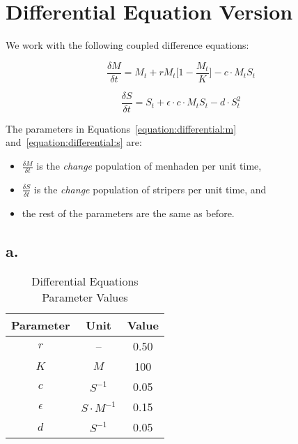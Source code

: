 \section{Differential Equation Version}
\label{sec:defferential-equation-version}

We work with the following coupled difference equations:

\begin{equation}
    \label{equation:differential:m}
    \frac{\delta M}{\delta t} = M_t + r M_t \bigg[ 1 - \frac{M_t}{K} \bigg] - c \cdot M_t S_t
\end{equation}

\begin{equation}
    \label{equation:differential:s}
    \frac{\delta S}{\delta t} = S_t + \epsilon \cdot c \cdot M_t S_t - d \cdot S_t^{2}
\end{equation}

The parameters in Equations~\ref{equation:differential:m} and~\ref{equation:differential:s} are:

\begin{itemize}
    \item $\frac{\delta M}{\delta t}$ is the \textit{change} population of menhaden per unit time,
    \item $\frac{\delta S}{\delta t}$ is the \textit{change} population of stripers per unit time, and
    \item the rest of the parameters are the same as before.
\end{itemize}


\subsection*{a.}

\begin{table}[h!]
    \begin{center}
        \begin{tabular}{c|c|c}
            \textbf{Parameter} & \textbf{Unit} & \textbf{Value} \\
            \hline
            $r$ & -- & 0.50 \\
            $K$ & $M$ & 100 \\
            $c$ & $S^{-1}$ & 0.05 \\
            $\epsilon$ & $S \cdot M^{-1}$ & 0.15 \\
            $d$ & $S^{-1}$ & 0.05 \\
        \end{tabular}
        \caption{Differential Equations Parameter Values}
        \label{table:differential-parameters}
    \end{center}
\end{table}


